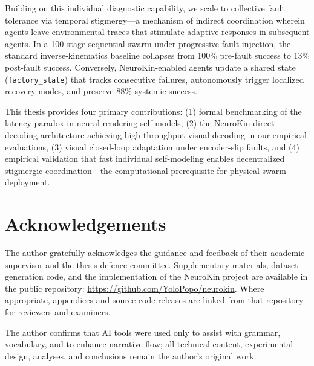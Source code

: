 \documentclass[12pt,a4paper,oneside]{report}
\begin{document}
Building on this individual diagnostic capability, we scale to collective fault tolerance via temporal stigmergy—a mechanism of indirect coordination wherein agents leave environmental traces that stimulate adaptive responses in subsequent agents. In a 100-stage sequential swarm under progressive fault injection, the standard inverse-kinematics baseline collapses from 100\% pre-fault success to 13\% post-fault success. Conversely, NeuroKin-enabled agents update a shared state (\texttt{factory\_state}) that tracks consecutive failures, autonomously trigger localized recovery modes, and preserve 88\% systemic success.

This thesis provides four primary contributions: (1) formal benchmarking of the latency paradox in neural rendering self-models, (2) the NeuroKin direct decoding architecture achieving high-throughput visual decoding in our empirical evaluations, (3) visual closed-loop adaptation under encoder-slip faults, and (4) empirical validation that fast individual self-modeling enables decentralized stigmergic coordination—the computational prerequisite for physical swarm deployment.

\clearpage

\chapter*{Acknowledgements}

The author gratefully acknowledges the guidance and feedback of their academic supervisor and the thesis defence committee. Supplementary materials, dataset generation code, and the implementation of the NeuroKin project are available in the public repository: \url{https://github.com/YoloPopo/neurokin}. Where appropriate, appendices and source code releases are linked from that repository for reviewers and examiners.

The author confirms that AI tools were used only to assist with grammar, vocabulary, and to enhance narrative flow; all technical content, experimental design, analyses, and conclusions remain the author's original work.

\clearpage

\tableofcontents
\clearpage
\listoffigures
{}
\clearpage
\listoftables
{}
\clearpage

\end{document}
